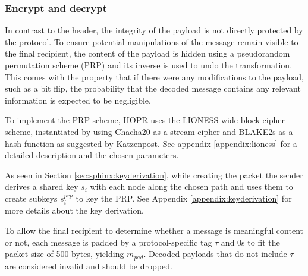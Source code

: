 \subsubsection{Encrypt and decrypt}
\label{sec:sphinx:payload}

In contrast to the header, the integrity of the payload is not directly protected by the protocol. To ensure potential manipulations of the message remain visible to the final recipient, the content of the payload is hidden using a pseudorandom permutation scheme (PRP) and its inverse is used to undo the transformation. This comes with the property that if there were any modifications to the payload, such as a bit flip, the probability that the decoded message contains any relevant information is expected to be negligible.

To implement the PRP scheme, HOPR uses the LIONESS \cite{lionesspaper} wide-block cipher scheme, instantiated by using Chacha20 as a stream cipher and BLAKE2s as a hash function as suggested by \href{https://katzenpost.mixnetworks.org/docs/specs/lioness.html}{Katzenpost}. See appendix \ref{appendix:lioness} for a detailed description and the chosen parameters.

As seen in Section \ref{sec:sphinx:keyderivation}, while creating the packet the sender derives a shared key $s_i$ with each node along the chosen path and uses them to create subkeys $s_i^{prp}$ to key the PRP. See Appendix \ref{appendix:keyderivation} for more details about the key derivation.

To allow the final recipient to determine whether a message is meaningful content or not, each message is padded by a protocol-specific tag $\tau$ and 0s to fit the packet size of 500 bytes, yielding $m_{pad}$. Decoded payloads that do not include $\tau$ are considered invalid and should be dropped.

